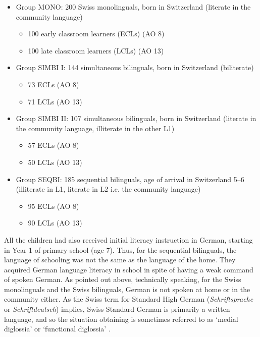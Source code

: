 \documentclass[output=paper,modfonts,nonflat,newtxmath]{langsci/langscibook}
\begin{document}
\begin{itemize}
\item
Group MONO: 200 Swiss monolinguals, born in Switzerland (literate in the community language)


\begin{itemize}
\item
100 early classroom learners (ECLs) (AO 8)

\item
100 late classroom learners (LCLs) (AO 13)

\end{itemize}
\item
Group SIMBI I: 144 simultaneous bilinguals, born in Switzerland (biliterate)


\begin{itemize}
\item
73 ECLs (AO 8)

\item
71 LCLs (AO 13)

\end{itemize}
\item
Group SIMBI II: 107 simultaneous bilinguals, born in Switzerland (literate in the community language, illiterate in the other L1)


\begin{itemize}
\item
57 ECLs (AO 8)

\item
50 LCLs (AO 13)

\end{itemize}
\item
Group SEQBI: 185 sequential bilinguals, age of arrival in Switzerland 5--6 (illiterate in L1, literate in L2 i.e. the community language)


\begin{itemize}
\item
95 ECLs (AO 8)

\item
90 LCLs (AO 13)

\end{itemize}
\end{itemize}

All the children had also received initial literacy instruction in German, starting in Year 1 of primary school (age 7). Thus, for the sequential bilinguals, the language of schooling was not the same as the language of the home. They acquired German language literacy in school in spite of having a weak command of spoken German. As pointed out above, technically speaking, for the Swiss monolinguals and the Swiss bilinguals, German is not spoken at home or in the community either. As the Swiss term for Standard High German (\textit{Schriftsprache} or \textit{Schriftdeutsch}) implies, Swiss Standard German is primarily a written language, and so the situation obtaining is sometimes referred to as ‘medial diglossia’ \citep{Kolde1981} or ‘functional diglossia’ \citep{Rash1998}.
\end{document}
